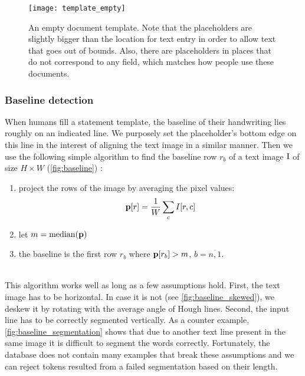			\begin{figure}
				\centering
				\texttt{[image: template\_empty]}
				\caption[Document template]{An empty document template. Note that the placeholders are slightly bigger than the location for text entry in order to allow text that goes out of bounds. Also, there are placeholders in places that do not correspond to any field, which matches how people use these documents.}
				\label{fig:template}
			\end{figure}


		\subsubsection{Baseline detection}
			When humans fill a statement template, the baseline of their handwriting lies roughly on an indicated line.  We purposely set the placeholder's bottom edge on this line in the interest of aligning the text image in a similar manner. Then we use the following simple algorithm to find the baseline row \(r_b\) of a text image \(\mathrm{I}\) of size \(H \times W\) (\autoref{fig:baseline}) :
			\noindent\begin{minipage}{\linewidth}
			\begin{enumerate}
				\item project the rows of the image by averaging the pixel values: \[
					\mathbf{p}[r] = \frac{1}{W} \sum_c I[r,c]
				\]
				\item let \(m = \operatorname{median}(\mathbf{p})\)
				\item the baseline is the first row \(r_b\) where \(\mathbf{p}[r_b] > m\), \(b = \overline{n, 1}\).
			\end{enumerate}
			\end{minipage}\\

			This algorithm works well as long as a few assumptions hold. First, the text image has to be horizontal. In case it is not (see \autoref{fig:baseline_skewed}), we deskew it by rotating with the average angle of Hough lines. Second, the input line has to be correctly segmented vertically. As a counter example, \autoref{fig:baseline_segmentation} shows that due to another text line present in the same image it is difficult to segment the words correctly. Fortunately, the database does not contain many examples that break these assumptions and we can reject tokens resulted from a failed segmentation based on their length.

